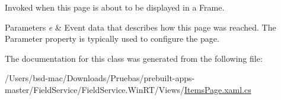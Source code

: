 Invoked when this page is about to be displayed in a Frame. 


\begin{DoxyParams}{Parameters}
{\em e} & Event data that describes how this page was reached. The Parameter property is typically used to configure the page.\\
\hline
\end{DoxyParams}


The documentation for this class was generated from the following file\+:\begin{DoxyCompactItemize}
\item 
/\+Users/bsd-\/mac/\+Downloads/\+Pruebas/prebuilt-\/apps-\/master/\+Field\+Service/\+Field\+Service.\+Win\+R\+T/\+Views/\hyperlink{_items_page_8xaml_8cs}{Items\+Page.\+xaml.\+cs}\end{DoxyCompactItemize}
